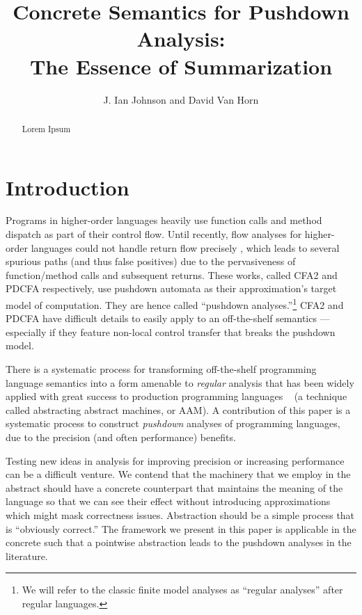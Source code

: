 \documentclass{llncs}
\title{Concrete Semantics for Pushdown Analysis:\\The Essence of Summarization}
\author{J. Ian Johnson and David Van Horn}
\institute{Northeastern University \\
           \email{\{ianj,dvanhorn\}@ccs.neu.edu}}
\begin{document}
\maketitle


\begin{abstract}
  Lorem Ipsum
\end{abstract}

\section{Introduction}

Programs in higher-order languages heavily use function calls and
method dispatch as part of their control flow. Until recently, flow
analyses for higher-order languages could not handle return flow
precisely \citep{ianjohnson:vardoulakis-lmcs11,
  ianjohnson:earl2010pdcfa}, which leads to several spurious paths
(and thus false positives) due to the pervasiveness of function/method
calls and subsequent returns. These works, called CFA2 and PDCFA
respectively, use pushdown automata as their approximation's target
model of computation. They are hence called ``pushdown
analyses.''\footnote{We will refer to the classic finite model
  analyses as ``regular analyses'' after regular languages.} CFA2 and
PDCFA have difficult details to easily apply to an off-the-shelf
semantics --- especially if they feature non-local control transfer
that breaks the pushdown model.

There is a systematic process for transforming off-the-shelf
programming language semantics into a form amenable to \emph{regular}
analysis that has been widely applied with great success to production
programming languages ~\citet{dvanhorn:VanHorn2010Abstracting} (a
technique called abstracting abstract machines, or AAM). A
contribution of this paper is a systematic process to construct
\emph{pushdown} analyses of programming languages, due to the
precision (and often performance) benefits.

Testing new ideas in analysis for improving precision or increasing
performance can be a difficult venture. We contend that the machinery
that we employ in the abstract should have a concrete counterpart that
maintains the meaning of the language so that we can see their effect
without introducing approximations which might mask correctness
issues. Abstraction should be a simple process that is ``obviously
correct.'' The framework we present in this paper is applicable in the
concrete such that a pointwise abstraction leads to the pushdown
analyses in the literature.
\end{document}
